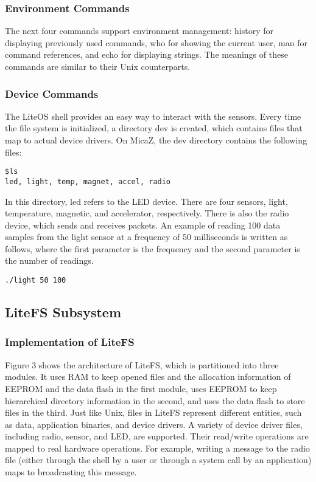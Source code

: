 \subsubsection{Environment Commands}
The next four commands support environment management: history for displaying previously used commands,
who for showing the current user, man for command references, and echo for displaying strings. The meanings of
these commands are similar to their Unix counterparts.

\subsubsection{Device Commands}
The LiteOS shell provides an easy way to interact with the
sensors. Every time the file system is initialized, a directory
dev is created, which contains files that map to actual device
drivers. On MicaZ, the dev directory contains the following
files:
\begin{lstlisting}[language={[ANSI]C},keywordstyle=\color{blue!70},commentstyle=\color{red!50!green!50!blue!50},frame=shadowbox, rulesepcolor=\color{red!20!green!20!blue!20}]
$ls
led, light, temp, magnet, accel, radio
\end{lstlisting}

In this directory, led refers to the LED device. There are
four sensors, light, temperature, magnetic, and accelerator,
respectively. There is also the radio device, which sends and
receives packets. An example of reading 100 data samples
from the light sensor at a frequency of 50 milliseconds is
written as follows, where the first parameter is the frequency
and the second parameter is the number of readings.

\begin{lstlisting}[language={[ANSI]C},keywordstyle=\color{blue!70},commentstyle=\color{red!50!green!50!blue!50},frame=shadowbox, rulesepcolor=\color{red!20!green!20!blue!20}]
./light 50 100
\end{lstlisting}   


\subsection{LiteFS Subsystem}
\subsubsection{Implementation of LiteFS}
Figure 3 shows the architecture of LiteFS, which is partitioned into three modules. It uses RAM to keep opened files
and the allocation information of EEPROM and the data
flash in the first module, uses EEPROM to keep hierarchical
directory information in the second, and uses the data flash
to store files in the third. Just like Unix, files in LiteFS represent different entities, such as data, application binaries,
and device drivers. A variety of device driver files, including radio, sensor, and LED, are supported. Their read/write
operations are mapped to real hardware operations. For example, writing a message to the radio file (either through the
shell by a user or through a system call by an application)
maps to broadcasting this message.

